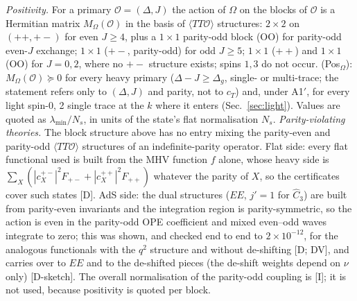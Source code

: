 \documentclass[aps,prl,onecolumn,superscriptaddress,nofootinbib]{revtex4-2}
\begin{document}
\emph{Positivity.} For a primary $\mathcal O=(\Delta,J)$ the action of $\Omega$ on the blocks of
$\mathcal O$ is a Hermitian matrix $M_\Omega(\mathcal O)$ in the basis of $\langle TT\mathcal O\rangle$
structures: $2\times2$ on $(++,+-)$ for even $J\ge4$, plus a $1\times1$ parity-odd block (OO) for
parity-odd even-$J$ exchange; $1\times1$ ($+-$, parity-odd) for odd $J\ge5$; $1\times1$ ($++$) and
$1\times1$ (OO) for $J=0,2$, where no $+-$ structure exists; spins $1,3$ do not occur. (Pos$_\Omega$):
$M_\Omega(\mathcal O)\succeq0$ for every heavy primary ($\Delta-J\ge\Delta_g$, single- or multi-trace; the statement
refers only to $(\Delta,J)$ and parity, not to $c_T$) and, under A1$'$, for every
light spin-0, 2 single trace at the $k$ where it enters (Sec.~\ref{sec:light}). Values are quoted as
$\lambda_{\min}/N_s$, in units of the state's flat normalisation $N_s$.
\emph{Parity-violating theories.} The block structure above has no entry mixing the parity-even and parity-odd
$\langle TT\mathcal O\rangle$ structures of an indefinite-parity operator. Flat side: every flat functional used
is built from the MHV function $f$ alone, whose heavy side is $\sum_X(|c^{+-}_X|^2F_{+-}+|c^{++}_X|^2F_{++})$ whatever
the parity of $X$, so the certificates cover such states [D]. AdS side: the dual structures ($EE$, $j'=1$ for
$\hat C_3$) are built from parity-even invariants and the integration region is parity-symmetric, so the action
is even in the parity-odd OPE coefficient and mixed even--odd waves integrate to zero; this was shown, and
checked end to end to $2\times10^{-12}$, for the analogous functionals with the $q^2$ structure and without de-shifting [D; DV], and carries over to $EE$ and to the
de-shifted pieces (the de-shift weights depend on $\nu$ only) [D-sketch]. The overall normalisation of the
parity-odd coupling is [I]; it is not used, because positivity is quoted per block.
\end{document}
